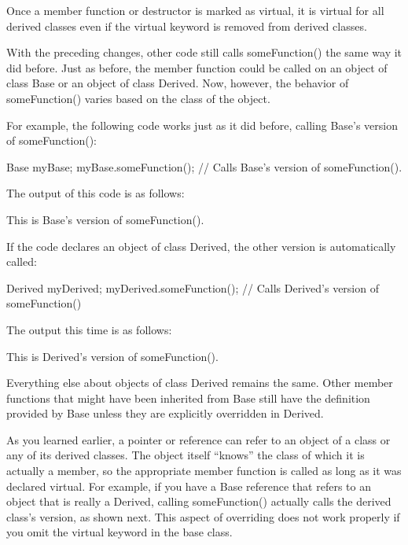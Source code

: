 Once a member function or destructor is marked as virtual, it is virtual for all derived classes even if the virtual keyword is removed from derived classes.


With the preceding changes, other code still calls someFunction() the same way it did before. Just as before, the member function could be called on an object of class Base or an object of class Derived. Now, however, the behavior of someFunction() varies based on the class of the object.

For example, the following code works just as it did before, calling Base’s version of someFunction():

\begin{cpp}
Base myBase;
myBase.someFunction(); // Calls Base's version of someFunction().
\end{cpp}

The output of this code is as follows:

\begin{shell}
This is Base's version of someFunction().
\end{shell}

If the code declares an object of class Derived, the other version is automatically called:

\begin{cpp}
Derived myDerived;
myDerived.someFunction(); // Calls Derived's version of someFunction()
\end{cpp}

The output this time is as follows:

\begin{shell}
This is Derived's version of someFunction().
\end{shell}

Everything else about objects of class Derived remains the same. Other member functions that might have been inherited from Base still have the definition provided by Base unless they are explicitly overridden in Derived.

As you learned earlier, a pointer or reference can refer to an object of a class or any of its derived classes. The object itself “knows” the class of which it is actually a member, so the appropriate member function is called as long as it was declared virtual. For example, if you have a Base reference that refers to an object that is really a Derived, calling someFunction() actually calls the derived class’s version, as shown next. This aspect of overriding does not work properly if you omit the virtual keyword in the base class.

